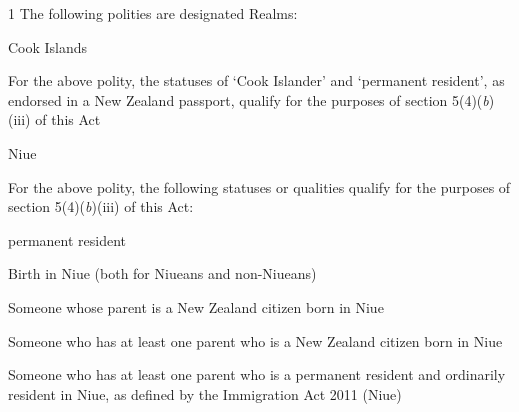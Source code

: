 \documentclass[private]{ukbill}
\begin{document}
\begin{nostat}
\item[1]   The following polities are designated Realms:
\begin{numstat}
\item Cook Islands
\begin{alphstat}
	\item For the above polity, the statuses  of `Cook Islander' and `permanent resident', as endorsed in a New Zealand passport,  qualify for the purposes of section 5(4)(\textit{b})(iii) of this Act
\end{alphstat}
\item Niue
\begin{alphstat}
	\item For the above polity, the following statuses or qualities qualify for the purposes of section 5(4)(\textit{b})(iii) of this Act:
	\begin{romstat}
		\item permanent resident 
		\item Birth in Niue (both for Niueans and non-Niueans)
		\item Someone whose parent is a New Zealand citizen born in Niue
		\item Someone who has at least one parent who is a New Zealand citizen born in Niue
		\item Someone who has at least one parent who is a permanent resident and ordinarily resident in Niue, as defined by the Immigration Act 2011 (Niue)
	\end{romstat}
\end{alphstat} 
\end{numstat}
\end{nostat}
\end{document}
